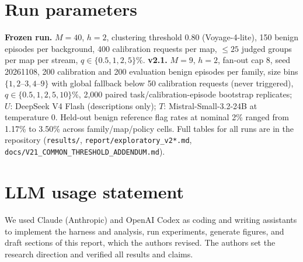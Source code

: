 \documentclass[10pt]{article}
\begin{document}
\section{Run parameters}
\textbf{Frozen run.} $M=40$, $h=2$, clustering threshold 0.80 (Voyage-4-lite), 150 benign episodes per background, 400 calibration requests per map, $\leq 25$ judged groups per map per stream, $q\in\{0.5,1,2,5\}\%$. \textbf{v2.1.} $M=9$, $h=2$, fan-out cap 8, seed 20261108, 200 calibration and 200 evaluation benign episodes per family, size bins $\{1, 2\text{--}3, 4\text{--}9\}$ with global fallback below 50 calibration requests (never triggered), $q\in\{0.5,1,2,5,10\}\%$, 2,000 paired task/calibration-episode bootstrap replicates; $U$: DeepSeek V4 Flash (descriptions only); $T$: Mistral-Small-3.2-24B at temperature 0. Held-out benign reference flag rates at nominal 2\% ranged from 1.17\% to 3.50\% across family/map/policy cells. Full tables for all runs are in the repository (\texttt{results/}, \texttt{report/exploratory\_v2*.md}, \texttt{docs/V21\_COMMON\_THRESHOLD\_ADDENDUM.md}).

\section{LLM usage statement}
We used Claude (Anthropic) and OpenAI Codex as coding and writing assistants to implement the harness and analysis, run experiments, generate figures, and draft sections of this report, which the authors revised. The authors set the research direction and verified all results and claims.
\end{document}
